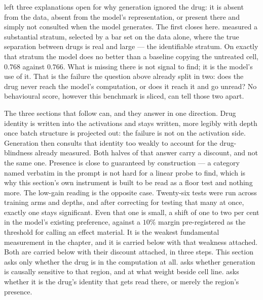 \noindent
{} left three explanations open for why generation ignored the
drug: it is absent from the data, absent from the model's representation, or
present there and simply not consulted when the model generates. The first
closes here.  measured a substantial stratum, selected by a
bar set on the data alone, where the true separation between drugs is real and
large --- the identifiable stratum. On exactly that
stratum the model does no better than a baseline copying the untreated cell,
$0.768$ against $0.766$. What is missing there is not signal to find; it is the
model's use of it. That is the failure the question above already split in two:
does the drug never reach the model's computation, or does it reach it and go
unread? No behavioural score, however this benchmark is sliced, can tell those
two apart.

The three sections that follow can, and they answer in one direction. Drug
identity is written into the activations and stays written, more legibly with
depth once batch structure is projected out: the failure is not on the
activation side. Generation then consults that identity too weakly to account
for the drug-blindness already measured. Both halves of that answer carry a
discount, and not the same one. Presence is close to guaranteed by construction
--- a category named verbatim in the prompt is not hard for a linear probe to
find, which is why this section's own instrument is built to be read as a floor
test and nothing more. The low-gain reading is the opposite case. Twenty-six tests were run across
training arms and depths, and after correcting for testing that many at once,
exactly one stays significant. Even that one is small, a shift of one to two per
cent in the model's existing preference, against a $10\%$ margin pre-registered
as the threshold for calling an effect material. It is the weakest fundamental
measurement in the chapter, and it is carried below with that weakness attached. Both are carried below with their
discount attached, in three steps. This section asks only whether the drug is in
the computation at all.  asks whether generation is causally
sensitive to that region, and at what weight beside cell line. 
asks whether it is the drug's identity that gets read there, or merely the
region's presence.


